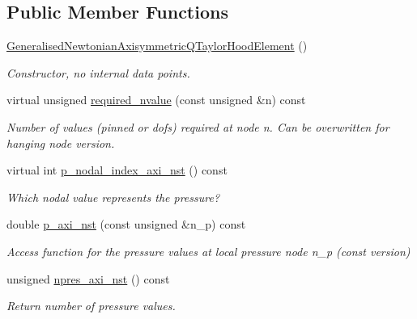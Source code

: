 \subsection*{Public Member Functions}
\begin{DoxyCompactItemize}
\item 
\hyperlink{classoomph_1_1GeneralisedNewtonianAxisymmetricQTaylorHoodElement_a29b42f6405e73cdaebd2f78267bf3435}{Generalised\+Newtonian\+Axisymmetric\+Q\+Taylor\+Hood\+Element} ()
\begin{DoxyCompactList}\small\item\em Constructor, no internal data points. \end{DoxyCompactList}\item 
virtual unsigned \hyperlink{classoomph_1_1GeneralisedNewtonianAxisymmetricQTaylorHoodElement_a1a0b75b3b43b92a5b85909886d1a94ab}{required\+\_\+nvalue} (const unsigned \&n) const
\begin{DoxyCompactList}\small\item\em Number of values (pinned or dofs) required at node n. Can be overwritten for hanging node version. \end{DoxyCompactList}\item 
virtual int \hyperlink{classoomph_1_1GeneralisedNewtonianAxisymmetricQTaylorHoodElement_a466839d0840b8511fa1dec0f60d9b92c}{p\+\_\+nodal\+\_\+index\+\_\+axi\+\_\+nst} () const
\begin{DoxyCompactList}\small\item\em Which nodal value represents the pressure? \end{DoxyCompactList}\item 
double \hyperlink{classoomph_1_1GeneralisedNewtonianAxisymmetricQTaylorHoodElement_aaabd34755d0ea72214bb7cdd9cd4a7e6}{p\+\_\+axi\+\_\+nst} (const unsigned \&n\+\_\+p) const
\begin{DoxyCompactList}\small\item\em Access function for the pressure values at local pressure node n\+\_\+p (const version) \end{DoxyCompactList}\item 
unsigned \hyperlink{classoomph_1_1GeneralisedNewtonianAxisymmetricQTaylorHoodElement_a4de8fa7d1779cede165db652ebd0c978}{npres\+\_\+axi\+\_\+nst} () const
\begin{DoxyCompactList}\small\item\em Return number of pressure values. \end{DoxyCompactList}\item 

\end{DoxyCompactItemize}
